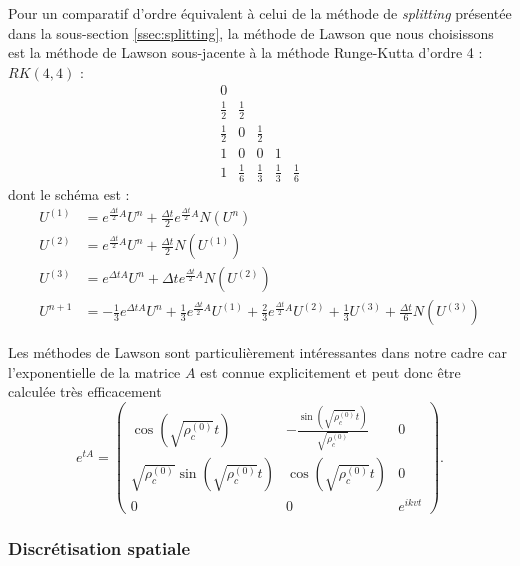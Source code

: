 Pour un comparatif d'ordre équivalent à celui de la méthode de \emph{splitting} présentée dans la sous-section \ref{ssec:splitting}, la méthode de Lawson que nous choisissons est la méthode de Lawson sous-jacente à la méthode Runge-Kutta d'ordre 4 : $RK(4,4)$ :
$$
  \begin{array}{c|cccc}
    0           & \\
    \frac{1}{2} & \frac{1}{2} \\
    \frac{1}{2} & 0           & \frac{1}{2} \\
    1           & 0           & 0           & 1           \\
  \hline
    1           & \frac{1}{6} & \frac{1}{3} & \frac{1}{3} & \frac{1}{6}
  \end{array}
$$
dont le schéma est :
$$
  \begin{aligned}
    U^{(1)} &= e^{\frac{\Delta t}{2}A}U^n + \frac{\Delta t}{2}e^{\frac{\Delta t}{2}A} N(U^n)\\
    U^{(2)} &= e^{\frac{\Delta t}{2}A}U^n + \frac{\Delta t}{2}N(U^{(1)}) \\
    U^{(3)} &= e^{\Delta t A}U^n + \Delta t e^{\frac{\Delta t}{2}A}N(U^{(2)}) \\
    U^{n+1} &= -\frac{1}{3}e^{\Delta tA}U^n + \frac{1}{3}e^{\frac{\Delta t}{2}A}U^{(1)} + \frac{2}{3}e^{\frac{\Delta t}{2}A}U^{(2)} + \frac{1}{3}U^{(3)} + \frac{\Delta t}{6}N(U^{(3)})
  \end{aligned}
$$

Les méthodes de Lawson sont particulièrement intéressantes dans notre cadre car l'exponentielle de la matrice $A$ est connue explicitement et peut donc être calculée très efficacement 
$$
  e^{tA} = \begin{pmatrix}
    \cos\left(\sqrt{\rho_c^{(0)}}t\right)                    & -\frac{\sin\left(\sqrt{\rho_c^{(0)}}t\right)}{\sqrt{\rho_c^{(0)}}} & 0 \\
    \sqrt{\rho_c^{(0)}}\sin\left(\sqrt{\rho_c^{(0)}}t\right) & \cos\left(\sqrt{\rho_c^{(0)}}t\right)                              & 0 \\
    0                                                        & 0                                                                  & e^{ikvt}
  \end{pmatrix}. 
$$

\subsubsection{Discrétisation spatiale}

